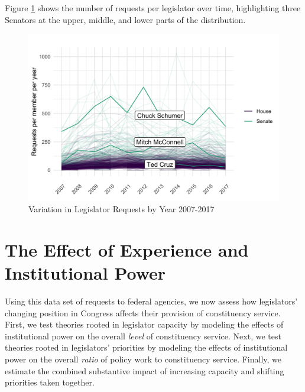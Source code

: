 \documentclass[12pt]{article}
\begin{document}
Figure \ref{f:peryear} shows the number of requests per legislator over time, highlighting three Senators at the upper, middle, and lower parts of the distribution.

\begin{figure}
\centering
\caption{Variation in Legislator Requests by Year 2007-2017} \label{f:peryear} 
\begin{minipage}{\textwidth}
\includegraphics[width = \textwidth]{figs/counts-per-year-1}
\end{minipage}
\end{figure}

\section{The Effect of Experience and Institutional Power}\label{s:results} 

Using this data set of requests to federal agencies, we now assess how legislators' changing position in Congress affects their provision of constituency service. First, we test theories rooted in legislator capacity by modeling the effects of institutional power on the overall \textit{level} of constituency service. Next, we test theories rooted in legislators' priorities by modeling the effects of institutional power on the overall \textit{ratio} of policy work to constituency service. Finally, we estimate the combined substantive impact of increasing capacity and shifting priorities taken together. 
\end{document}
